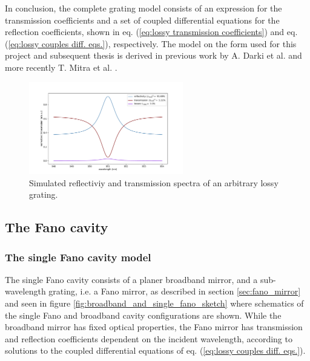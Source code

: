 In conclusion, the complete grating model consists of an expression for the transmission coefficients and a set of coupled differential equations for the reflection coefficients, shown in eq. (\ref{eq:lossy transmission coefficients}) and eq. (\ref{eq:lossy couples diff. eqs.}), respectively. The model on the form used for this project and subsequent thesis is derived in previous work by A. Darki et al. \cite{Darki} and more recently T. Mitra et al. \cite{Mitra}.

\begin{figure}[h!]
    \centering
    \includegraphics[width=0.6\textwidth]{figures/grating_spectrum_lossy_example.pdf}
    \caption{Simulated reflectiviy and transmission spectra of an arbitrary lossy grating.}
    \label{fig:lossy_grating_spectrum}
\end{figure}

\subsection{The Fano cavity}

\subsubsection{The single Fano cavity model}

The single Fano cavity consists of a planer broadband mirror, and a sub-wavelength grating, i.e. a Fano mirror, as described in section \ref{sec:fano_mirror} and seen in figure \ref{fig:broadband_and_single_fano_sketch} where schematics of the single Fano and broadband cavity configurations are shown. While the broadband mirror has fixed optical properties, the Fano mirror has transmission and reflection coefficients dependent on the incident wavelength, according to solutions to the coupled differential equations of eq. (\ref{eq:lossy couples diff. eqs.}). 

